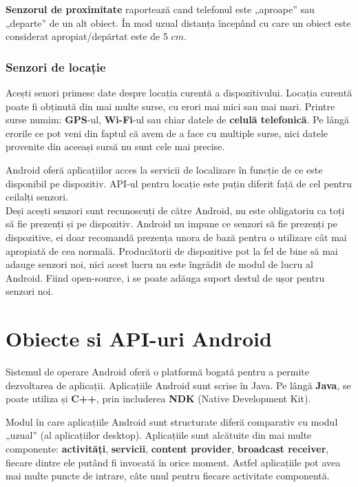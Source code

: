 \documentclass[12pt,a4paper]{article}
\begin{document}
\textbf{Senzorul de proximitate} raportează cand telefonul este „aproape” sau „departe” de un alt obiect. În mod uzual distanța începând cu care un obiect este considerat apropiat/depărtat este de 5 $cm$.

\subsubsection{Senzori de locație}
Acești senori primesc date despre locația curentă a dispozitivului. Locația curentă poate fi obținută din mai multe surse, cu erori mai mici sau mai mari. Printre surse numim: \textbf{GPS}-ul, \textbf{Wi-Fi}-ul sau chiar datele de \textbf{celulă telefonică}. Pe lângă erorile ce pot veni din faptul că avem de a face cu multiple surse, nici datele provenite din aceeași sursă nu sunt cele mai precise.

Android oferă aplicațiilor acces la servicii de localizare în funcție de ce este disponibil pe dispozitiv. API-ul pentru locație este puțin diferit față de cel pentru ceilalți senzori.\\

Deși acești senzori sunt recunoscuți de către Android, nu este obligatoriu ca toți să fie prezenți și pe dispozitiv. Android nu impune ce senzori să fie prezenți pe dispozitive, ei doar recomandă prezența unora de bază pentru o utilizare cât mai apropiată de cea normală. Producătorii de dispozitive pot la fel de bine să mai adauge senzori noi, nici acest lucru nu este îngrădit de modul de lucru al Android. Fiind open-source, i se poate adăuga suport destul de ușor pentru senzori noi.

\newpage

\section{Obiecte si API-uri Android} \label{ObiecteAndroid}
Sistemul de operare Android oferă o platformă bogată pentru a permite dezvoltarea de aplicații. Aplicațiile Android sunt scrise în Java. Pe lângă \textbf{Java}, se poate utiliza și \textbf{C++}, prin includerea \textbf{NDK} (Native Development Kit).

Modul în care aplicațiile Android sunt structurate diferă comparativ cu modul „uzual” (al aplicațiilor desktop). Aplicațiile sunt alcătuite din mai multe componente: \textbf{activități}, \textbf{servicii}, \textbf{content provider}, \textbf{broadcast receiver}, fiecare dintre ele putând fi invocată în orice moment. Astfel aplicațiile pot avea mai multe puncte de intrare, câte unul pentru fiecare activitate componentă.
\end{document}
